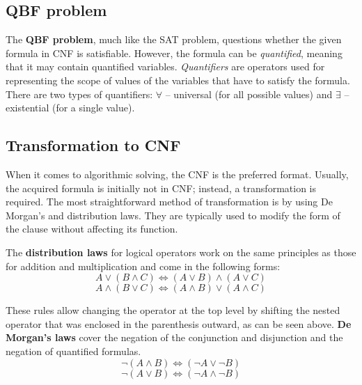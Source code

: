 \subsection*{QBF problem}
The \textbf{QBF problem}, much like the SAT problem, questions whether the given formula in CNF is satisfiable. However, the formula can be \textit{quantified}, meaning that it may contain quantified variables. \textit{Quantifiers} are operators used for representing the scope of values of the variables that have to satisfy the formula. There are two types of quantifiers:  $\forall$ -- universal (for all possible values) and $\exists$ -- existential (for a single value).

\subsection*{Transformation to CNF}
When it comes to algorithmic solving, the CNF is the preferred format. Usually, the acquired formula is initially not in CNF; instead, a transformation is required.
The most straightforward method of transformation is by using De Morgan's and distribution laws. They are typically used to modify the form of the clause without affecting its function.

The \textbf{distribution laws} for logical operators work on the same principles as those for addition and multiplication and come in the following forms:
\begin{equation*}
    A \lor (B \land C) \iff (A \lor B) \land (A \lor C) 
\end{equation*}
\begin{equation*}
    A \land (B \lor C) \iff (A \land B) \lor (A \land C)
\end{equation*}

These rules allow changing the operator at the top level by shifting the nested operator that was enclosed in the parenthesis outward, as can be seen above.
\textbf{De Morgan's laws} cover the negation of the conjunction and disjunction and the negation of quantified formulas.
\begin{equation*}
    \neg (A \land B) \iff (\neg A \lor \neg B)
\end{equation*}
\begin{equation*}
   \neg (A \lor B) \iff (\neg A \land \neg B)
\end{equation*}

